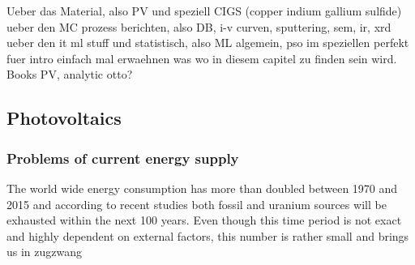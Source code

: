 Ueber das Material, also PV und speziell CIGS (copper indium gallium sulfide) 
ueber den MC prozess berichten, also DB, i-v curven, sputtering, sem, ir, xrd
ueber den it ml stuff und statistisch, also ML algemein, pso im speziellen 
perfekt fuer intro einfach mal erwaehnen was wo in diesem capitel zu finden sein wird. 
Books PV, analytic otto? 
\subsection{Photovoltaics}
\iffalse
The grundlage for all pvs is the photovoltaik effect which was entdeckt by Albert Einstein adn for which he got the nobel price. 
The Prinziple is easy: When the energy (E = hv) of the light is \td{large,strong,big,high}er than the binding energy of an electron the electron is ejected with the remaining energy as kinetic energy 
\begin{math}
	E_{kin}=hv - Eb
\end{math}
Different Materials have different binding energies. 
Metals do have in general lower binding energies than covalent bound material and semiconductors do have even lowers E_b. Really? 
That's Silica is in a lot of PVs. 
The next generation of PVs. 
CIGS has in contrast to silicon based PV a direct band gap\td{source and what does that mean?}
duennschicht pv, haben eine effeftivitaet von 7-16\% vs 15-22\% \cite{Mertens2018}
\fi
\subsubsection{Problems of current energy supply}
The world wide energy consumption has more than doubled between 1970 and 2015\cite{BP2017} and according to recent studies both fossil\cite{BGR2017} and uranium sources\cite{Uran2006} 
will be exhausted within the next 100 years. 
Even though this time period is not exact and highly dependent on external factors, this number is rather small and brings us in zugzwang

